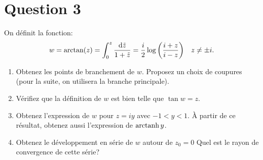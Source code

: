 \section*{Question 3}
On définit la fonction:
\begin{align*}
  w & = \arctan(z) = \int_0^z \frac{\operatorname{d}\!\tilde{z}}{1+\tilde{z}}
  = \frac{i}{2}\log\left(\frac{i+z}{i-z}\right) & z \neq \pm i.
\end{align*}
\begin{enumerate}
  \item Obtenez les points de branchement de $w$.
    Proposez un choix de coupures
    (pour la suite, on utilisera la branche principale).
  \item Vérifiez que la définition de $w$ est bien telle que $\tan w = z$.
  \item Obtenez l'expression de $w$ pour $z = iy$
    avec $-1 < y < 1$.
    À partir de ce résultat,
    obtenez aussi l'expression de $\operatorname{arctanh} y$.
  \item Obtenez le développement en série de $w$ autour de $z_0=0$
    Quel est le rayon de convergence de cette série?
\end{enumerate}
\rappelscomplexes

